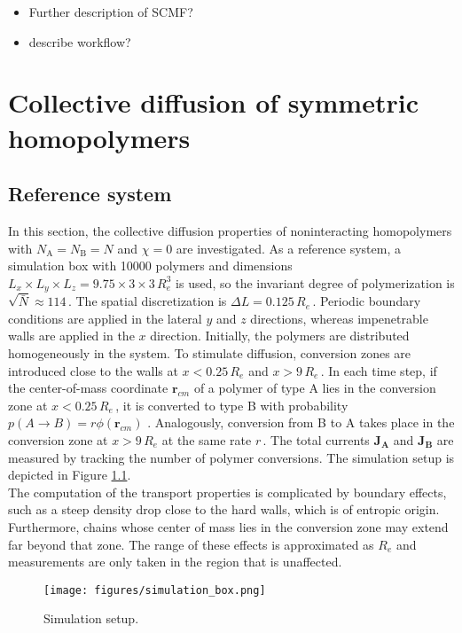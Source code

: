 \documentclass[bachelor,       %
               twoside,        %
               BCOR10mm,       %
                ngerman,english  %
               ]{GAUBM}
\begin{document}
\begin{itemize}
  \item Further description of SCMF?
  \item describe workflow?
\end{itemize}

\chapter{Collective diffusion of symmetric homopolymers}

\section{Reference system}

In this section, the collective diffusion properties of noninteracting homopolymers with $N_\mathrm A=N_\mathrm B=N$ and $\chi=0$ are investigated. As a reference system, a simulation box with 10000 polymers and dimensions $L_x\times L_y\times L_z=9.75\times3\times3\,R_e^3$ is used, so the invariant degree of polymerization is $\sqrt{\bar{N}}\approx 114\,$. The spatial discretization is $\Delta L=0.125\,R_e\,$.  Periodic boundary conditions are applied in the lateral $y$ and $z$ directions, whereas impenetrable walls are applied in the $x$ direction. Initially, the polymers are distributed homogeneously in the system. To stimulate diffusion, conversion zones are introduced close to the walls at $x<0.25\,R_e$ and $x>9\,R_e\,$. In each time step, if the center-of-mass coordinate $\mathbf r_{cm}$ of a polymer of type A lies in the conversion zone at $x<0.25\,R_e\,$, it is converted to type B with probability $p(A\rightarrow B)=r\phi(\mathbf r_{cm})$ \cite{Dreyer22}. Analogously, conversion from B to A takes place in the conversion zone at $x>9\,R_e$ at the same rate $r\,$. The total currents $\mathbf{J_A}$ and $\mathbf{J_B}$ are measured by tracking the number of polymer conversions. The simulation setup is depicted in Figure \ref{fig:simulation_box}. \\
The computation of the transport properties is complicated by boundary effects, such as a steep density drop close to the hard walls, which is of entropic origin. Furthermore, chains whose center of mass lies in the conversion zone may extend far beyond that zone. The range of these effects is approximated as $R_e$ and measurements are only taken in the region that is unaffected. 


\begin{figure}[h]
  \centering
  \texttt{[image: figures/simulation\_box.png]}
  \caption{Simulation setup.}
  \label{fig:simulation_box}
\end{figure}
\end{document}
